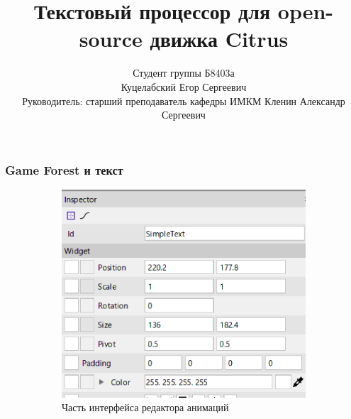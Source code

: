 \documentclass[10pt, unicode]{beamer}
\title{Текстовый процессор для open-source движка Citrus}
\author{Студент группы Б8403а\\Куцелабский Егор Сергеевич\\Руководитель: старший 
преподаватель кафедры ИМКМ Кленин Александр Сергеевич}
\date{}
\begin{document}
    \begin{frame}
        \titlepage
        \thispagestyle{empty}
    \end{frame}
    \begin{frame}
        \frametitle{Game Forest и текст}
        \begin{figure}[h]
            \centering
            \begin{subfigure}[h]{0.59\textwidth}
                \includegraphics[width=\textwidth]{images/TangerineInterface.png}
                \caption{Часть интерфейса редактора анимаций}
            \end{subfigure}
            \begin{subfigure}[h]{0.4\textwidth}

\end{subfigure}
\end{figure}
\end{frame}
\end{document}
